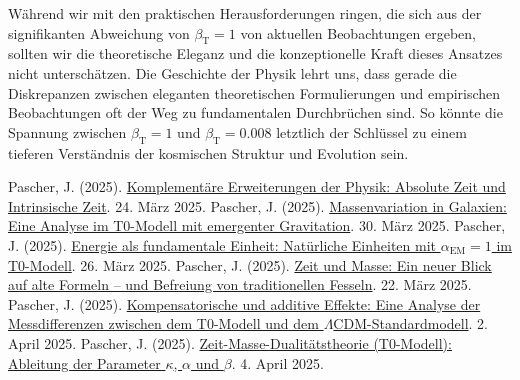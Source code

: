 \documentclass[12pt,a4paper]{article}
\newcommand{\betaT}{\beta_{\text{T}}}
\newcommand{\alphaEM}{\alpha_{\text{EM}}}
\begin{document}
	Während wir mit den praktischen Herausforderungen ringen, die sich aus der signifikanten Abweichung von \(\betaT = 1\) von aktuellen Beobachtungen ergeben, sollten wir die theoretische Eleganz und die konzeptionelle Kraft dieses Ansatzes nicht unterschätzen. Die Geschichte der Physik lehrt uns, dass gerade die Diskrepanzen zwischen eleganten theoretischen Formulierungen und empirischen Beobachtungen oft der Weg zu fundamentalen Durchbrüchen sind. So könnte die Spannung zwischen \(\betaT = 1\) und \(\betaT = 0.008\) letztlich der Schlüssel zu einem tieferen Verständnis der kosmischen Struktur und Evolution sein.
	
	\begin{thebibliography}{99}
		 Pascher, J. (2025). \href{https://github.com/jpascher/T0-Time-Mass-Duality/tree/main/2/pdf/Deutsch/Komplementäre Erweiterungen der Physik - Absolute Zeit und Intrinsische Zeit.pdf}{Komplementäre Erweiterungen der Physik: Absolute Zeit und Intrinsische Zeit}. 24. März 2025.
		 Pascher, J. (2025). \href{https://github.com/jpascher/T0-Time-Mass-Duality/tree/main/2/pdf/Deutsch/Massenvariation in Galaxien.pdf}{Massenvariation in Galaxien: Eine Analyse im T0-Modell mit emergenter Gravitation}. 30. März 2025.
		 Pascher, J. (2025). \href{https://github.com/jpascher/T0-Time-Mass-Duality/tree/main/2/pdf/Deutsch/Natürliche Einheiten mit Feinstrukturkonstante alpha = 1.pdf}{Energie als fundamentale Einheit: Natürliche Einheiten mit \(\alphaEM = 1\) im T0-Modell}. 26. März 2025.
		 Pascher, J. (2025). \href{https://github.com/jpascher/T0-Time-Mass-Duality/tree/main/2/pdf/Deutsch/Zeit und Masse Ein neuer Blick auf alte Formeln – und die Befreiung von traditionellen Fesseln.pdf}{Zeit und Masse: Ein neuer Blick auf alte Formeln – und Befreiung von traditionellen Fesseln}. 22. März 2025.
		 Pascher, J. (2025). \href{https://github.com/jpascher/T0-Time-Mass-Duality/tree/main/2/pdf/Deutsch/Analyse der Messdifferenzen zwischen dem T0-Modell und dem Standardmodell.pdf}{Kompensatorische und additive Effekte: Eine Analyse der Messdifferenzen zwischen dem T0-Modell und dem \(\Lambda\)CDM-Standardmodell}. 2. April 2025.
		 Pascher, J. (2025). \href{https://github.com/jpascher/T0-Time-Mass-Duality/tree/main/2/pdf/Deutsch/Zeit-Masse-Dualitätstheorie (T0-Modell) Herleitung der Parameter kappa, alpha und beta.pdf}{Zeit-Masse-Dualitätstheorie (T0-Modell): Ableitung der Parameter \(\kappa\), \(\alpha\) und \(\beta\)}. 4. April 2025.

\end{thebibliography}
\end{document}
